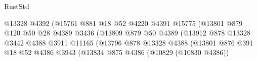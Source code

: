 \begin{lexlean}{RustStd}
\begin{coremodule}
                                                  @13328
                                                  @4392
                                                  (@15761
                                                    @881
                                                    @18
                                                    @52
                                                    @4220
                                                    @4391
                                                    @15775
                                                    (@13801
                                                      @879
                                                      @120
                                                      @50
                                                      @28
                                                      @4389
                                                      @3436
                                                      (@13809
                                                        @879
                                                        @50
                                                        @4389
                                                        (@13912
                                                          @878
                                                          @13328
                                                          @3442
                                                          @4388
                                                          @3911
                                                          @11165
                                                          (@13796
                                                            @878
                                                            @13328
                                                            @4388
                                                            (@13801
                                                              @876
                                                              @391
                                                              @18
                                                              @52
                                                              @4386
                                                              @3943
                                                              (@13834
                                                                @875
                                                                @4386
                                                                (@10829 (@10830 @4386))

\end{coremodule}
\end{lexlean}
